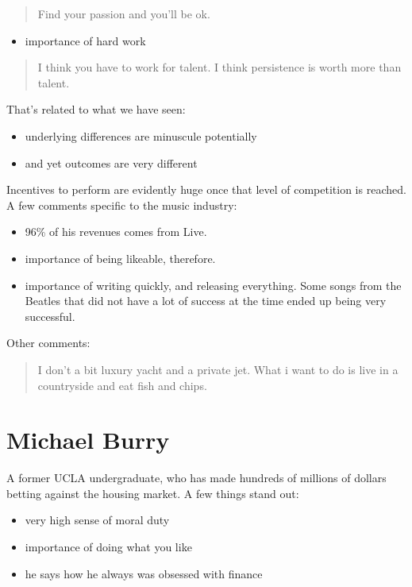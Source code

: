 \documentclass[]{book}
\providecommand{\tightlist}{%
  \setlength{\itemsep}{0pt}\setlength{\parskip}{0pt}}
\theoremstyle{definition}
\theoremstyle{definition}
\theoremstyle{definition}
\theoremstyle{remark}
\begin{document}
\begin{quote}
Find your passion and you'll be ok.
\end{quote}

\begin{itemize}
\tightlist
\item
  importance of hard work
\end{itemize}

\begin{quote}
I think you have to work for talent. I think persistence is worth more
than talent.
\end{quote}

That's related to what we have seen:

\begin{itemize}
\tightlist
\item
  underlying differences are minuscule potentially
\item
  and yet outcomes are very different
\end{itemize}

Incentives to perform are evidently huge once that level of competition
is reached. A few comments specific to the music industry:

\begin{itemize}
\tightlist
\item
  96\% of his revenues comes from Live.
\item
  importance of being likeable, therefore.
\item
  importance of writing quickly, and releasing everything. Some songs
  from the Beatles that did not have a lot of success at the time ended
  up being very successful.
\end{itemize}

Other comments:

\begin{quote}
I don't a bit luxury yacht and a private jet. What i want to do is live
in a countryside and eat fish and chips.
\end{quote}

\section{Michael Burry}\label{michael-burry}

A former UCLA undergraduate, who has made hundreds of millions of
dollars betting against the housing market. A few things stand out:

\begin{itemize}
\tightlist
\item
  very high sense of moral duty
\item
  importance of doing what you like
\item
  he says how he always was obsessed with finance
\end{itemize}
\end{document}
